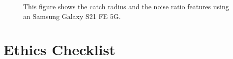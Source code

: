 \documentclass{l4proj}
\begin{document}
\begin{appendices}
\begin{figure}
    \caption{This figure shows the catch radius and the noise ratio features using an Samsung Galaxy S21 FE 5G.
    }
    \label{fig:s21noiseandcatch}
\end{figure}

\chapter{Ethics Checklist}




\end{appendices}






\end{document}
